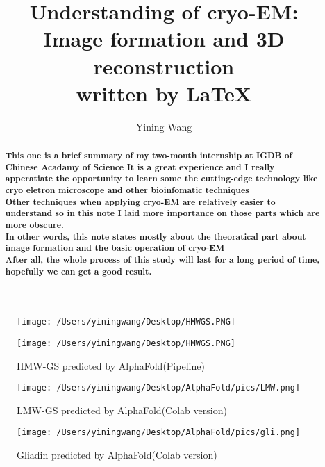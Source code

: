 \documentclass{article}
\author{Yining Wang}
\title { \LARGE \bf Understanding of cryo-EM: \\ \bf  Image formation and 3D reconstruction\\ \normalsize written by \LaTeX{} }
\begin{document}
    \maketitle
    \thispagestyle{empty}
    \begin{figure}[h]
        \centering   
        \texttt{[image: /Users/yiningwang/Desktop/HMWGS.PNG]} 
    \end{figure}

   
    \newpage
    \tableofcontents


    \newpage
    \thispagestyle{empty}
    \begin{figure}[p]
        \centering
        \texttt{[image: /Users/yiningwang/Desktop/HMWGS.PNG]} 
        \caption{\small HMW-GS predicted by AlphaFold(Pipeline)}
    \end{figure}
    \begin{figure}[p]
        \centering
        \texttt{[image: /Users/yiningwang/Desktop/AlphaFold/pics/LMW.png]} 
        \caption{\small LMW-GS predicted by AlphaFold(Colab version)}
    \end{figure}
    \begin{figure}[p]
        \centering
        \texttt{[image: /Users/yiningwang/Desktop/AlphaFold/pics/gli.png]} 
        \caption{\small Gliadin predicted by AlphaFold(Colab version)}
    \end{figure}
    
    \newpage




    \begin{abstract}
        \bf This one is a brief summary of my two-month internship at IGDB of Chinese Acadamy of Science
        It is a great experience and I really apperatiate the opportunity to learn some the cutting-edge
        technology like cryo eletron microscope and other bioinfomatic techniques \\
        Other techniques when applying cryo-EM are relatively easier to understand so in this note I laid more importance on 
        those parts which are more obscure.\\ In other words, this note states mostly about the theoratical part about 
        image formation and the basic operation of cryo-EM\\After all, the whole process of this study will last
        for a long period of time, hopefully we can get a good result.

    \end{abstract}
    \newpage
\end{document}
